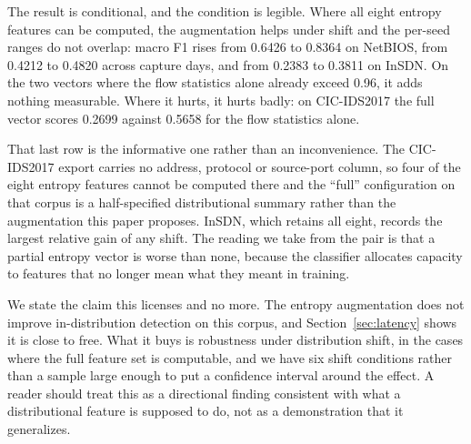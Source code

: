 \documentclass{ieeeaccess}
\begin{document}
The result is conditional, and the condition is legible. Where all eight entropy
features can be computed, the augmentation helps under shift and the per-seed
ranges do not overlap: macro F1 rises from 0.6426 to 0.8364 on NetBIOS, from
0.4212 to 0.4820 across capture days, and from 0.2383 to 0.3811 on InSDN. On the
two vectors where the flow statistics alone already exceed 0.96, it adds nothing
measurable. Where it hurts, it hurts badly: on CIC-IDS2017 the full vector scores
0.2699 against 0.5658 for the flow statistics alone.

That last row is the informative one rather than an inconvenience. The
CIC-IDS2017 export carries no address, protocol or source-port column, so four of
the eight entropy features cannot be computed there and the ``full''
configuration on that corpus is a half-specified distributional summary rather
than the augmentation this paper proposes. InSDN, which retains all eight,
records the largest relative gain of any shift. The reading we take from the pair
is that a partial entropy vector is worse than none, because the classifier
allocates capacity to features that no longer mean what they meant in training.

We state the claim this licenses and no more. The entropy augmentation does not
improve in-distribution detection on this corpus, and Section~\ref{sec:latency}
shows it is close to free. What it buys is robustness under distribution shift,
in the cases where the full feature set is computable, and we have six shift
conditions rather than a sample large enough to put a confidence interval around
the effect. A reader should treat this as a directional finding consistent with
what a distributional feature is supposed to do, not as a demonstration that it
generalizes.
\end{document}
